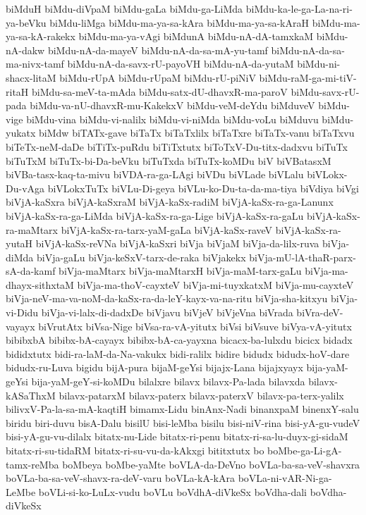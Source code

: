 {biMduH
biMdu-diVpaM
biMdu-gaLa
biMdu-ga-LiMda
biMdu-ka-le-ga-La-na-ri-ya-beVku
biMdu-liMga
biMdu-ma-ya-sa-kAra
biMdu-ma-ya-sa-kAraH
biMdu-ma-ya-sa-kA-rakekx
biMdu-ma-ya-vAgi
biMdunA
biMdu-nA-dA-tamxkaM
biMdu-nA-dakw
biMdu-nA-da-mayeV
biMdu-nA-da-sa-mA-yu-tamf
biMdu-nA-da-sa-ma-nivx-tamf
biMdu-nA-da-savx-rU-payoVH
biMdu-nA-da-yutaM
biMdu-ni-shacx-litaM
biMdu-rUpA
biMdu-rUpaM
biMdu-rU-piNiV
biMdu-raM-ga-mi-tiV-ritaH
biMdu-sa-meV-ta-mAda
biMdu-satx-dU-dhavxR-ma-paroV
biMdu-savx-rU-pada
biMdu-va-nU-dhavxR-mu-KakekxV
biMdu-veM-deYdu
biMduveV
biMdu-vige
biMdu-vina
biMdu-vi-nalilx
biMdu-vi-niMda
biMdu-voLu
biMduvu
biMdu-yukatx
biMdw
biTATx-gave
biTaTx
biTaTxlilx
biTaTxre
biTaTx-vanu
biTaTxvu
biTeTx-neM-daDe
biTiTx-puRdu
biTiTxtutx
biToTxV-Du-titx-dadxvu
biTuTx
biTuTxM
biTuTx-bi-Da-beVku
biTuTxda
biTuTx-koMDu
biV
biVBatasxM
biVBa-tasx-kaq-ta-mivu
biVDA-ra-ga-LAgi
biVDu
biVLade
biVLalu
biVLokx-Du-vAga
biVLokxTuTx
biVLu-Di-geya
biVLu-ko-Du-ta-da-ma-tiya
biVdiya
biVgi
biVjA-kaSxra
biVjA-kaSxraM
biVjA-kaSx-radiM
biVjA-kaSx-ra-ga-Lanunx
biVjA-kaSx-ra-ga-LiMda
biVjA-kaSx-ra-ga-Lige
biVjA-kaSx-ra-gaLu
biVjA-kaSx-ra-maMtarx
biVjA-kaSx-ra-tarx-yaM-gaLa
biVjA-kaSx-raveV
biVjA-kaSx-ra-yutaH
biVjA-kaSx-reVNa
biVjA-kaSxri
biVja
biVjaM
biVja-da-lilx-ruva
biVja-diMda
biVja-gaLu
biVja-keSxV-tarx-de-raka
biVjakekx
biVja-mU-lA-thaR-parx-sA-da-kamf
biVja-maMtarx
biVja-maMtarxH
biVja-maM-tarx-gaLu
biVja-ma-dhayx-sithxtaM
biVja-ma-thoV-cayxteV
biVja-mi-tuyxkatxM
biVja-mu-cayxteV
biVja-neV-ma-va-noM-da-kaSx-ra-da-leY-kayx-va-na-ritu
biVja-sha-kitxyu
biVja-vi-Didu
biVja-vi-lalx-di-dadxDe
biVjavu
biVjeV
biVjeVna
biVrada
biVra-deV-vayayx
biVrutAtx
biVsa-Nige
biVsa-ra-vA-yitutx
biVsi
biVsuve
biVya-vA-yitutx
bibibxbA
bibibx-bA-cayayx
bibibx-bA-ca-yayxna
bicacx-ba-lulxdu
bicicx
bidadx
bididxtutx
bidi-ra-laM-da-Na-vakukx
bidi-ralilx
bidire
bidudx
bidudx-hoV-dare
bidudx-ru-Luva
bigidu
bijA-pura
bijaM-geYsi
bijajx-Lana
bijajxyayx
bija-yaM-geYsi
bija-yaM-geY-si-koMDu
bilalxre
bilavx
bilavx-Pa-lada
bilavxda
bilavx-kASaThxM
bilavx-patarxM
bilavx-paterx
bilavx-paterxV
bilavx-pa-terx-yalilx
bilivxV-Pa-la-sa-mA-kaqtiH
bimamx-Lidu
binAnx-Nadi
binanxpaM
binenxY-salu
biridu
biri-duvu
bisA-Dalu
bisilU
bisi-leMba
bisilu
bisi-niV-rina
bisi-yA-gu-vudeV
bisi-yA-gu-vu-dilalx
bitatx-nu-Lide
bitatx-ri-penu
bitatx-ri-sa-lu-duyx-gi-sidaM
bitatx-ri-su-tidaRM
bitatx-ri-su-vu-da-kAkxgi
bititxtutx
bo
boMbe-ga-Li-gA-tamx-reMba
boMbeya
boMbe-yaMte
boVLA-da-DeVno
boVLa-ba-sa-veV-shavxra
boVLa-ba-sa-veV-shavx-ra-deV-varu
boVLa-kA-kAra
boVLa-ni-vAR-Ni-ga-LeMbe
boVLi-si-ko-LuLx-vudu
boVLu
boVdhA-diVkeSx
boVdha-dali
boVdha-diVkeSx
}
